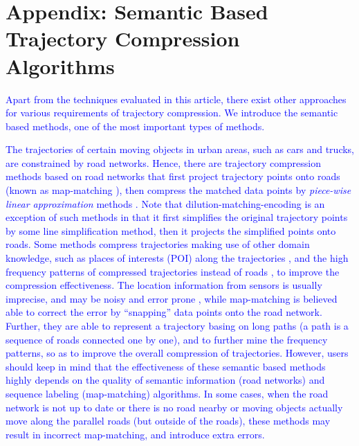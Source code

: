 \section*{{Appendix: Semantic Based Trajectory Compression Algorithms}}
\textcolor{blue}{Apart from the techniques evaluated in this article, there exist other approaches for various requirements of trajectory compression. We introduce the semantic based methods, one of the most important types of methods.}

\textcolor{blue}{The trajectories of certain moving objects in urban areas, such as cars and trucks, are constrained by road networks. Hence, there are trajectory compression methods based on road networks \cite{Chen:Trajectory, Popa:Spatio,Civilis:Techniques,Hung:Clustering, Kellaris:Map, Song:PRESS, Han:Compress, Cao:Road} that first project trajectory points onto roads (known as map-matching \cite{Quddus:MapMatching}), then compress the matched data points by \emph{piece-wise linear approximation} methods \cite{Elmeleegy:Stream, Xie:Stream,Luo:Streaming,ORourke:Fitting}. Note that dilution-matching-encoding \cite{Gotsman:Compaction} is an exception of such methods in that it first simplifies the original trajectory points by some line simplification method, then it projects the simplified points onto roads.}
%
\textcolor{blue}{Some methods \cite{Schmid:Semantic, Richter:Semantic} compress trajectories making use of other domain knowledge, such as places of interests (POI) along the trajectories \cite{Richter:Semantic}, and the high frequency patterns of compressed trajectories instead of roads \cite{Gotsman:Compaction, Song:PRESS, Han:Compress,Koide:CiNCT}, to improve the compression effectiveness.}
%
\textcolor{blue}{The location information from sensors is usually imprecise, and may be noisy and error prone \cite{Cao:Road}, while map-matching is believed able to correct the error by ``snapping'' data points onto the road network. Further, they are able to represent a trajectory basing on long paths (a path is a sequence of roads connected one by one), and to further mine the frequency patterns, so as to improve the overall compression of trajectories.}
%
\textcolor{blue}{However, users should keep in mind that the effectiveness of these semantic based methods highly depends on the quality of semantic information (\eg road networks) and sequence labeling (\eg map-matching) algorithms. In some cases, \eg when the road network is not up to date or there is no road nearby or moving objects actually move along the parallel roads (but outside of the roads), these methods may result in incorrect map-matching, and introduce extra errors.}

